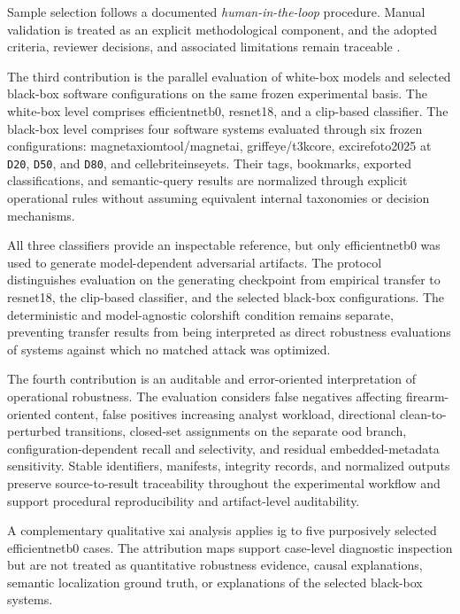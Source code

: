 Sample selection follows a documented \textit{human-in-the-loop} procedure.
Manual validation is treated as an explicit methodological component, and the
adopted criteria, reviewer decisions, and associated limitations remain
traceable
\cite{sambasivan2021data}.

The third contribution is the parallel evaluation of white-box models
and selected black-box software configurations on the same frozen experimental
basis. The white-box level comprises \gls{efficientnetb0}, \gls{resnet18}, and a
\gls{clip}-based classifier. The black-box level comprises four software systems
evaluated through six frozen configurations:
\gls{magnetaxiomtool}/\gls{magnetai},
\gls{griffeye}/\gls{t3kcore},
\gls{excirefoto2025} at \texttt{D20}, \texttt{D50}, and \texttt{D80}, and
\gls{cellebriteinseyets}. Their tags, bookmarks, exported classifications, and
semantic-query results are normalized through explicit operational rules without
assuming equivalent internal taxonomies or decision mechanisms.

All three classifiers provide an inspectable reference, but only
\gls{efficientnetb0} was used to generate model-dependent adversarial artifacts.
The protocol distinguishes evaluation on the generating checkpoint from
empirical transfer to \gls{resnet18}, the \gls{clip}-based classifier,
and the selected black-box configurations. The deterministic and model-agnostic
\gls{colorshift} condition remains separate, preventing transfer results from
being interpreted as direct robustness evaluations of systems against which no
matched attack was optimized.

The fourth contribution is an auditable and error-oriented interpretation of
operational robustness. The evaluation considers false negatives affecting
firearm-oriented content, false positives increasing analyst workload,
directional clean-to-perturbed transitions, closed-set assignments on the
separate \gls{ood} branch, configuration-dependent recall and selectivity, and
residual embedded-metadata sensitivity. Stable identifiers, manifests,
integrity records, and normalized outputs preserve source-to-result traceability
throughout the experimental workflow and support procedural reproducibility and
artifact-level auditability.

A complementary qualitative \gls{xai} analysis applies \gls{ig} to five
purposively selected \gls{efficientnetb0} cases. The attribution maps support
case-level diagnostic inspection but are not treated as quantitative robustness
evidence, causal explanations, semantic localization ground truth, or
explanations of the selected black-box systems.

